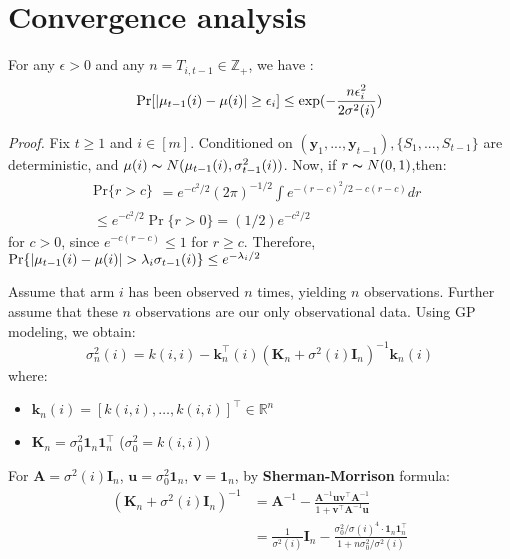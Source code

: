 \documentclass[opre,sglanonrev]{informs4}
\begin{document}
\section{Convergence analysis}
\begin{lemma}
For any $\epsilon > 0$ and any $n = T_{i,t-1} \in \mathbb{Z}_+$, we have :
$$
\textnormal{Pr}[|\mu_{t-1}(i)-\mu(i)|\geq \epsilon_i]\leq \exp(-\frac{n\epsilon_i^2}{2\sigma^2(i)})
$$
\end{lemma} 
\textit{Proof.} Fix $t\geq 1$ and $i\in [m]$. Conditioned on $(\mathbf{y}_1,...,\mathbf{y}_{t-1}), \{S_1,...,S_{t-1}\}$ are deterministic, and $\mu(i)\thicksim N(\mu_{t-1}(i),\sigma_{t-1}^2(i))$. Now, if $r\thicksim N(0,1)$,then: 
$$\begin{gathered}
\mathrm{Pr}\{r>c\}
\begin{aligned}
=e^{-c^2/2}(2\pi)^{-1/2}\int e^{-(r-c)^2/2-c(r-c)}dr
\end{aligned} \\
\leq e^{-c^2/2}\Pr\{r>0\}=(1/2)e^{-c^2/2}
\end{gathered}$$
for $c>0$, since $e^{-c(r-c)}\leq 1$ for $r\geq c$. Therefore, $\textnormal{Pr}\{|\mu_{t-1}(i)-\mu(i)|>\lambda_i \sigma_{t-1}(i)\}\leq e^{-\lambda_i/2}$

Assume that arm $i$ has been observed $n$ times, yielding $n$ observations. Further assume that these $n$ observations are our only observational data. Using GP modeling, we obtain:
\[
\sigma_n^2(i) = k(i,i) - \mathbf{k}_n^\top(i)(\mathbf{K}_n + \sigma^2(i)\mathbf{I}_n)^{-1}\mathbf{k}_n(i)
\]
where:
\begin{itemize}
    \item $\mathbf{k}_n(i) = [k(i,i),\dots,k(i,i)]^\top \in \mathbb{R}^n$
    \item $\mathbf{K}_n = \sigma_0^2\mathbf{1}_n\mathbf{1}_n^\top$ ($\sigma_0^2 = k(i,i)$)
\end{itemize} %

For $\mathbf{A} = \sigma^2(i)\mathbf{I}_n$, $\mathbf{u} = \sigma_0^2\mathbf{1}_n$, $\mathbf{v} = \mathbf{1}_n$, by \textbf{Sherman-Morrison} formula:
\begin{equation*}
\begin{aligned}
(\mathbf{K}_n + \sigma^2(i)\mathbf{I}_n)^{-1} &= \mathbf{A}^{-1} - \frac{\mathbf{A}^{-1}\mathbf{u}\mathbf{v}^\top\mathbf{A}^{-1}}{1 + \mathbf{v}^\top\mathbf{A}^{-1}\mathbf{u}} \\
&= \frac{1}{\sigma^2(i)}\mathbf{I}_n - \frac{\sigma_0^2/\sigma(i)^4 \cdot \mathbf{1}_n\mathbf{1}_n^\top}{1 + n\sigma_0^2/\sigma^2(i)}
\end{aligned}
\end{equation*} 
\end{document}
